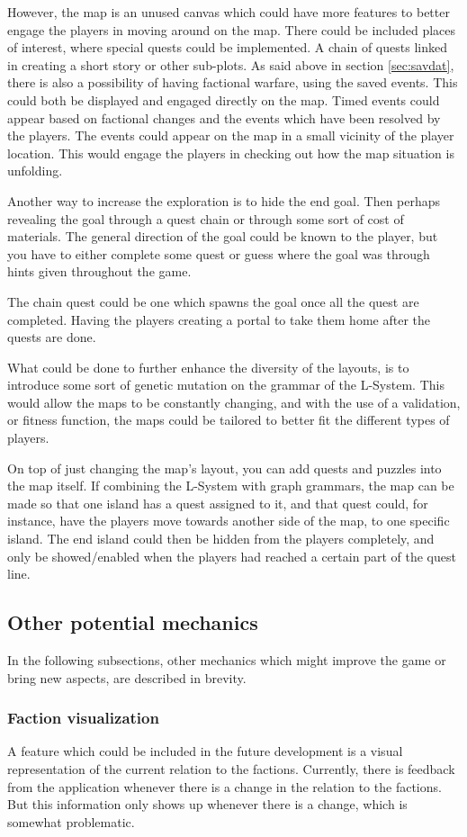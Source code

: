 However, the map is an unused canvas which could have more features to better engage the players in moving around on the map. 
There could be included places of interest, where special quests could be implemented. A chain of quests linked in creating a short story or other sub-plots. 
As said above in section \ref{sec:savdat}, there is also a possibility of having factional warfare, using the saved events. This could both be displayed and engaged directly on the map. 
Timed events could appear based on factional changes and the events which have been resolved by the players. The events could appear on the map in a small vicinity of the player location. This would engage the players in checking out how the map situation is unfolding. 

Another way to increase the exploration is to hide the end goal. Then perhaps revealing the goal through a quest chain or through some sort of cost of materials. The general direction of the goal could be known to the player, but you have to either complete some quest or guess where the goal was through hints given throughout the game.

The chain quest could be one which spawns the goal once all the quest are completed. Having the players creating a portal to take them home after the quests are done.

What could be done to further enhance the diversity of the layouts, is to introduce some sort of genetic mutation on the grammar of the L-System. This would allow the maps to be constantly changing, and with the use of a validation, or fitness function, the maps could be tailored to better fit the different types of players.

On top of just changing the map's layout, you can add quests and puzzles into the map itself. If combining the L-System with graph grammars, the map can be made so that one island has a quest assigned to it, and that quest could, for instance, have the players move towards another side of the map, to one specific island. 
The end island could then be hidden from the players completely, and only be showed/enabled when the players had reached a certain part of the quest line.

\subsection{Other potential mechanics}
In the following subsections, other mechanics which might improve the game or bring new aspects, are described in brevity. 
\subsubsection{Faction visualization}
A feature which could be included in the future development is a visual representation of the current relation to the factions.
Currently, there is feedback from the application whenever there is a change in the relation to the factions. But this information only shows up whenever there is a change, which is somewhat problematic. 

